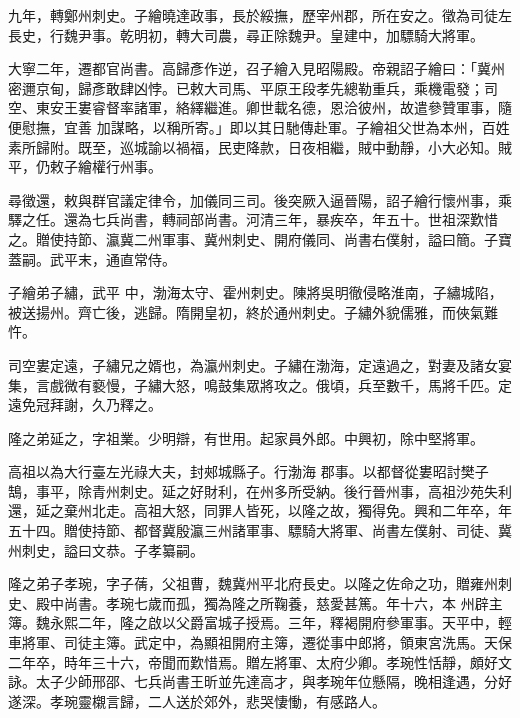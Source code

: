 \begin{pinyinscope}
 九年，轉鄭州刺史。子繪曉達政事，長於綏撫，歷宰州郡，所在安之。徵為司徒左長史，行魏尹事。乾明初，轉大司農，尋正除魏尹。皇建中，加驃騎大將軍。



 大寧二年，遷都官尚書。高歸彥作逆，召子繪入見昭陽殿。帝親詔子繪曰：「冀州密邇京甸，歸彥敢肆凶悖。已敕大司馬、平原王段孝先總勒重兵，乘機電發；司空、東安王婁睿督率諸軍，絡繹繼進。卿世載名德，恩洽彼州，故遣參贊軍事，隨便慰撫，宜善
 加謀略，以稱所寄。」即以其日馳傳赴軍。子繪祖父世為本州，百姓素所歸附。既至，巡城諭以禍福，民吏降款，日夜相繼，賊中動靜，小大必知。賊平，仍敕子繪權行州事。



 尋徵還，敕與群官議定律令，加儀同三司。後突厥入逼晉陽，詔子繪行懷州事，乘驛之任。還為七兵尚書，轉祠部尚書。河清三年，暴疾卒，年五十。世祖深歎惜之。贈使持節、瀛冀二州軍事、冀州刺史、開府儀同、尚書右僕射，謚曰簡。子寶蓋嗣。武平末，通直常侍。



 子繪弟子繡，武平
 中，渤海太守、霍州刺史。陳將吳明徹侵略淮南，子繡城陷，被送揚州。齊亡後，逃歸。隋開皇初，終於通州刺史。子繡外貌儒雅，而俠氣難忤。



 司空婁定遠，子繡兄之婿也，為瀛州刺史。子繡在渤海，定遠過之，對妻及諸女宴集，言戲微有褻慢，子繡大怒，鳴鼓集眾將攻之。俄頃，兵至數千，馬將千匹。定遠免冠拜謝，久乃釋之。



 隆之弟延之，字祖業。少明辯，有世用。起家員外郎。中興初，除中堅將軍。



 高祖以為大行臺左光祿大夫，封郟城縣子。行渤海
 郡事。以都督從婁昭討樊子鵠，事平，除青州刺史。延之好財利，在州多所受納。後行晉州事，高祖沙苑失利還，延之棄州北走。高祖大怒，同罪人皆死，以隆之故，獨得免。興和二年卒，年五十四。贈使持節、都督冀殷瀛三州諸軍事、驃騎大將軍、尚書左僕射、司徒、冀州刺史，謚曰文恭。子孝纂嗣。



 隆之弟子孝琬，字子蒨，父祖曹，魏冀州平北府長史。以隆之佐命之功，贈雍州刺史、殿中尚書。孝琬七歲而孤，獨為隆之所鞠養，慈愛甚篤。年十六，本
 州辟主簿。魏永熙二年，隆之啟以父爵富城子授焉。三年，釋褐開府參軍事。天平中，輕車將軍、司徒主簿。武定中，為顯祖開府主簿，遷從事中郎將，領東宮洗馬。天保二年卒，時年三十六，帝聞而歎惜焉。贈左將軍、太府少卿。孝琬性恬靜，頗好文詠。太子少師邢邵、七兵尚書王昕並先達高才，與孝琬年位懸隔，晚相逢遇，分好遂深。孝琬靈櫬言歸，二人送於郊外，悲哭悽慟，有感路人。




\end{pinyinscope}
